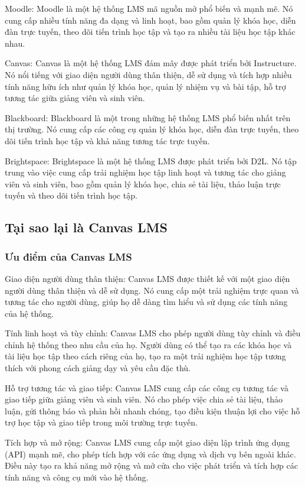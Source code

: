 \documentclass[../Thesis.tex]{subfiles}
\begin{document}
			Moodle: Moodle là một hệ thống LMS mã nguồn mở phổ biến và mạnh mẽ. Nó cung cấp nhiều tính năng đa dạng và linh hoạt, bao gồm quản lý khóa học, diễn đàn trực tuyến, theo dõi tiến trình học tập và tạo ra nhiều tài liệu học tập khác nhau.

			Canvas: Canvas là một hệ thống LMS đám mây được phát triển bởi Instructure. Nó nổi tiếng với giao diện người dùng thân thiện, dễ sử dụng và tích hợp nhiều tính năng hữu ích như quản lý khóa học, quản lý nhiệm vụ và bài tập, hỗ trợ tương tác giữa giảng viên và sinh viên.
			
			Blackboard: Blackboard là một trong những hệ thống LMS phổ biến nhất trên thị trường. Nó cung cấp các công cụ quản lý khóa học, diễn đàn trực tuyến, theo dõi tiến trình học tập và khả năng tương tác trực tuyến.
			
			Brightspace: Brightspace là một hệ thống LMS được phát triển bởi D2L. Nó tập trung vào việc cung cấp trải nghiệm học tập linh hoạt và tương tác cho giảng viên và sinh viên, bao gồm quản lý khóa học, chia sẻ tài liệu, thảo luận trực tuyến và theo dõi tiến trình học tập.

	\subsection{Tại sao lại là Canvas LMS}

		\subsubsection{Ưu điểm của Canvas LMS}
			Giao diện người dùng thân thiện: Canvas LMS được thiết kế với một giao diện người dùng thân thiện và dễ sử dụng. Nó cung cấp một trải nghiệm trực quan và tương tác cho người dùng, giúp họ dễ dàng tìm hiểu và sử dụng các tính năng của hệ thống.

			Tính linh hoạt và tùy chỉnh: Canvas LMS cho phép người dùng tùy chỉnh và điều chỉnh hệ thống theo nhu cầu của họ. Người dùng có thể tạo ra các khóa học và tài liệu học tập theo cách riêng của họ, tạo ra một trải nghiệm học tập tương thích với phong cách giảng dạy và yêu cầu đặc thù.

			Hỗ trợ tương tác và giao tiếp: Canvas LMS cung cấp các công cụ tương tác và giao tiếp giữa giảng viên và sinh viên. Nó cho phép việc chia sẻ tài liệu, thảo luận, gửi thông báo và phản hồi nhanh chóng, tạo điều kiện thuận lợi cho việc hỗ trợ học tập và giao tiếp trong môi trường trực tuyến.

			Tích hợp và mở rộng: Canvas LMS cung cấp một giao diện lập trình ứng dụng (API) mạnh mẽ, cho phép tích hợp với các ứng dụng và dịch vụ bên ngoài khác. Điều này tạo ra khả năng mở rộng và mở cửa cho việc phát triển và tích hợp các tính năng và công cụ mới vào hệ thống.
\end{document}

